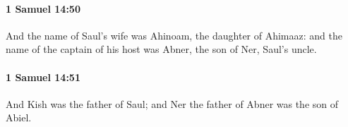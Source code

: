 		\paragraph{1 Samuel 14:50} %
			\label{1SAMUEL-14-50}

			And the name of Saul’s wife was Ahinoam, the daughter of Ahimaaz: and the name of the captain of his host was Abner, the son of Ner, Saul’s uncle.


		\paragraph{1 Samuel 14:51} %
			\label{1SAMUEL-14-51}

			And Kish was the father of Saul; and Ner the father of Abner was the son of Abiel.


